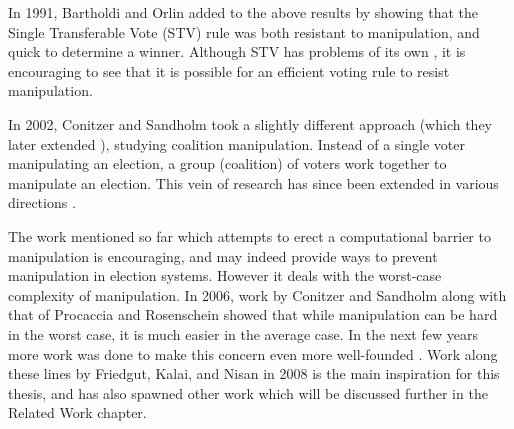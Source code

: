 	In 1991, Bartholdi and Orlin \cite{bartholdi1991single} added to the above results by showing that the Single Transferable Vote (STV) rule was both resistant to manipulation, and quick to determine a winner. Although STV has problems of its own \cite{brams1982ams, doron1977single, fishburn1983paradoxes, holzman1989vote, moulin1988condorcet}, it is encouraging to see that it is possible for an efficient voting rule to resist manipulation.

	In 2002, Conitzer and Sandholm took a slightly different approach \cite{conitzer2002vote} (which they later extended \cite{conitzer2007elections}), studying coalition manipulation. Instead of a single voter manipulating an election, a group (coalition) of voters work together to manipulate an election. This vein of research has since been extended in various directions \cite{conitzer2003universal, elkind2005hybrid, faliszewski2006complexity, hemaspaandra2007anyone, procaccia2007multi, elkind2005small}.

	The work mentioned so far which attempts to erect a computational barrier to manipulation is encouraging, and may indeed provide ways to prevent manipulation in election systems. However it deals with the worst-case complexity of manipulation. In 2006, work by Conitzer and Sandholm \cite{conitzer2006nonexistence} along with that of Procaccia and Rosenschein \cite{procaccia2006junta} showed that while manipulation can be hard in the worst case, it is much easier in the average case. In the next few years more work was done to make this concern even more well-founded \cite{procaccia2007average, erdelyi2007approximating}. Work along these lines by Friedgut, Kalai, and Nisan \cite{friedgut2008elections} in 2008 is the main inspiration for this thesis, and has also spawned other work which will be discussed further in the Related Work chapter.
